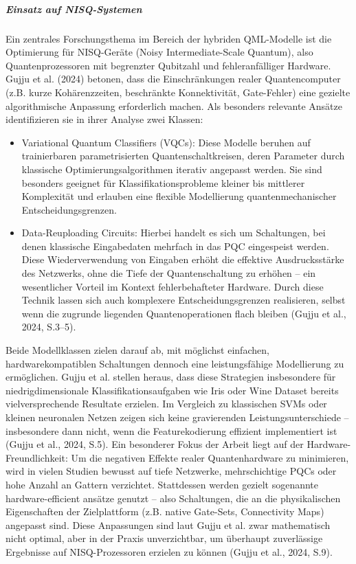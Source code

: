 \subparagraph{Einsatz auf NISQ-Systemen}
Ein zentrales Forschungsthema im Bereich der hybriden QML-Modelle ist die Optimierung für NISQ-Geräte (Noisy Intermediate-Scale Quantum), also Quantenprozessoren mit begrenzter Qubitzahl und fehleranfälliger Hardware. Gujju et al. (2024) betonen, dass die Einschränkungen realer Quantencomputer (z.B. kurze Kohärenzzeiten, beschränkte Konnektivität, Gate-Fehler) eine gezielte algorithmische Anpassung erforderlich machen. Als besonders relevante Ansätze identifizieren sie in ihrer Analyse zwei Klassen:
\begin{itemize}
  \item Variational Quantum Classifiers (VQCs): Diese Modelle beruhen auf trainierbaren parametrisierten Quantenschaltkreisen, deren Parameter durch klassische Optimierungsalgorithmen iterativ angepasst werden. Sie sind besonders geeignet für Klassifikationsprobleme kleiner bis mittlerer Komplexität und erlauben eine flexible Modellierung quantenmechanischer Entscheidungsgrenzen.
  \vspace{0.5em}
  \item Data-Reuploading Circuits: Hierbei handelt es sich um Schaltungen, bei denen klassische Eingabedaten mehrfach in das PQC eingespeist werden. Diese Wiederverwendung von Eingaben erhöht die effektive Ausdrucksstärke des Netzwerks, ohne die Tiefe der Quantenschaltung zu erhöhen – ein wesentlicher Vorteil im Kontext fehlerbehafteter Hardware. Durch diese Technik lassen sich auch komplexere Entscheidungsgrenzen realisieren, selbst wenn die zugrunde liegenden Quantenoperationen flach bleiben (Gujju et al., 2024, S.3–5).
\end{itemize}
Beide Modellklassen zielen darauf ab, mit möglichst einfachen, hardwarekompatiblen Schaltungen dennoch eine leistungsfähige Modellierung zu ermöglichen. Gujju et al. stellen heraus, dass diese Strategien insbesondere für niedrigdimensionale Klassifikationsaufgaben wie Iris oder Wine Dataset bereits vielversprechende Resultate erzielen. Im Vergleich zu klassischen SVMs oder kleinen neuronalen Netzen zeigen sich keine gravierenden Leistungsunterschiede – insbesondere dann nicht, wenn die Featurekodierung effizient implementiert ist (Gujju et al., 2024, S.5).
Ein besonderer Fokus der Arbeit liegt auf der Hardware-Freundlichkeit: Um die negativen Effekte realer Quantenhardware zu minimieren, wird in vielen Studien bewusst auf tiefe Netzwerke, mehrschichtige PQCs oder hohe Anzahl an Gattern verzichtet. Stattdessen werden gezielt sogenannte hardware-efficient ansätze genutzt – also Schaltungen, die an die physikalischen Eigenschaften der Zielplattform (z.B. native Gate-Sets, Connectivity Maps) angepasst sind. Diese Anpassungen sind laut Gujju et al. zwar mathematisch nicht optimal, aber in der Praxis unverzichtbar, um überhaupt zuverlässige Ergebnisse auf NISQ-Prozessoren erzielen zu können (Gujju et al., 2024, S.9).

